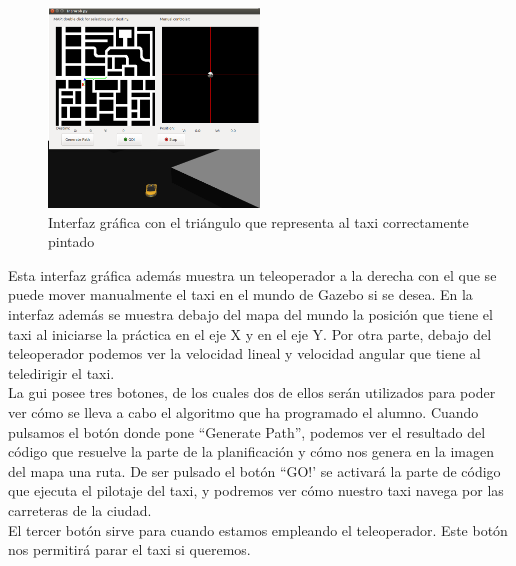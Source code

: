 \begin{figure}[H]
  \begin{center}
    \includegraphics[width=0.5\textwidth]{figures/GPP/triangulo_giro_correcto.png}
		\caption{Interfaz gráfica con el triángulo que representa al taxi correctamente pintado}
		\label{fig.triangulo_giro_correcto}
		\end{center}
\end{figure}

Esta interfaz gráfica además muestra un teleoperador a la derecha con el que se puede mover manualmente el taxi en el mundo de Gazebo si se desea. En la interfaz además se muestra debajo del mapa del mundo la posición que tiene el taxi al iniciarse la práctica en el eje X y en el eje Y. Por otra parte, debajo del teleoperador podemos ver la velocidad lineal y velocidad angular que tiene al teledirigir el taxi.\\

La \acrshort{gui} posee tres botones, de los cuales dos de ellos serán utilizados para poder ver cómo se lleva a cabo el algoritmo que ha programado el alumno. Cuando pulsamos el botón donde pone ``Generate Path'', podemos ver el resultado del código que resuelve la parte de la planificación y cómo nos genera en la imagen del mapa una ruta. De ser pulsado el botón ``GO!' se activará la parte de código que ejecuta el pilotaje del taxi, y podremos ver cómo nuestro taxi navega por las carreteras de la ciudad.\\

El tercer botón sirve para cuando estamos empleando el teleoperador. Este botón nos permitirá parar el taxi si queremos.\\

